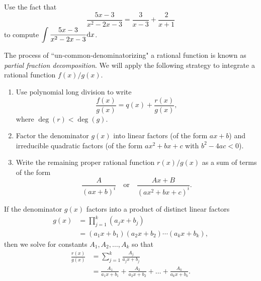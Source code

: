 

\begin{example}
Use the fact that
\begin{equation*}
\frac{5x-3}{x^2-2x-3} = \frac{3}{x-3} + \frac{2}{x+1}
\end{equation*}
to compute $\displaystyle \int\frac{5x-3}{x^2-2x-3} \mathrm{d} x$.
\end{example}


\vfill
\begin{remark}
The process of ``un-common-denominatorizing" a rational function is known as \textit{partial fraction decomposition}.
We will apply the following strategy to integrate a rational function $f(x)/g(x)$.
\begin{enumerate}
\item Use polynomial long division to write 
\begin{equation*}
\frac{f(x)}{g(x)} = q(x) + \frac{r(x)}{g(x)},
\end{equation*}
where $\deg(r)<\deg(g)$.
\item Factor the denominator $g(x)$ into linear factors (of the form $ax+b$) and irreducible quadratic factors (of the form $ax^2+bx+c$ with $b^2-4ac<0$).
\item Write the remaining proper rational function $r(x)/g(x)$ as a sum of terms of the form
\begin{equation*}
\frac{A}{(ax+b)^i}\quad\text{or}\quad\frac{Ax+B}{(ax^2+bx+c)^i}.
\end{equation*}
\end{enumerate}
\end{remark}

\newpage

\begin{remark}
If the denominator $g(x)$ factors into a product of distinct linear factors
\begin{equation*}
\begin{split}
g(x) &= \prod_{j=1}^k(a_jx+b_j)\\
& = (a_1x+b_1)(a_2x+b_2)\cdots (a_kx+b_k),
\end{split}
\end{equation*}
then we solve for constants $A_1, A_2,\dots, A_k$ so that
\begin{equation*}
\begin{split}
\frac{r(x)}{g(x)} &= \sum_{j=1}^k\frac{A_j}{a_jx+b_j}\\ 
&= \frac{A_1}{a_1x+b_1} + \frac{A_2}{a_2x+b_2} + \dots +\frac{A_k}{a_kx+b_k}. 
\end{split}
\end{equation*}
\end{remark}

